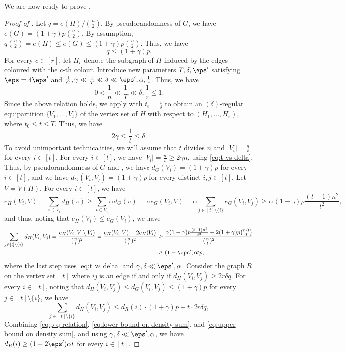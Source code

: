 \documentclass[10pt,a4paper,reqno]{amsart}
\begin{document}
We are now ready to prove .
\begin{proof}[Proof of ]
Let $q = e(H)/\binom{n}{2}$. By pseudorandomness of $G$, we have $e(G) = (1 \pm \gamma)p\binom{n}{2}$. By assumption, $q \binom{n}{2} = e(H)\le e(G) \le (1+\gamma) p \binom{n}{2}$. Thus, we have 
\begin{equation} \label{eq:p q relation}
q \le (1+\gamma)p.
\end{equation}
For every $c\in [r]$, let $H_c$ denote the subgraph of $H$ induced by the edges coloured with the $c$-th colour. 
Introduce new parameters $T,\delta,\eps'$ satisfying $\eps = 4\eps'$ and $\frac{1}{C}, \gamma \ll \frac{1}{T} \ll \delta \ll \eps', \alpha, \frac{1}{r}$. Thus, we have
\[
0< \frac{1}{n} \ll \frac{1}{T} \ll \delta, \frac{1}{r} \le 1.
\]
Since the above relation holds, we apply  with $t_0 = \frac{1}{\delta}$ to obtain an $(\delta)$-regular equipartition $\{V_1,\ldots,V_t\}$ of the vertex set of $H$ with respect to $(H_1,\dots,H_r)$, where $t_0 \le t \le T$. Thus, we have
\begin{equation} \label{eq:t vs delta}
2\gamma \le \frac{1}{t} \le \delta.
\end{equation}
To avoid unimportant technicalities, we will assume that $t$ divides $n$ and $|V_i| = \frac{n}{t}$ for every $i\in [t]$.
For every $i\in [t]$, we have $|V_i| = \frac{n}{t} \ge 2\gamma n$, using \eqref{eq:t vs delta}. Thus, by pseudorandomness of $G$ and , we have $d_G(V_i) = (1\pm \gamma)p$ for every $i\in [t]$, and we have $d_G(V_i,V_j) = (1\pm \gamma)p$ for every distinct $i, j\in [t]$. Let $V=V(H)$.
For every $i\in [t]$, we have 
\[
e_H(V_i,V)=\sum_{v\in V_i} d_H(v)
\ge \sum_{v\in V_i} \alpha d_G(v)
= \alpha e_G(V_i,V)
= \alpha \sum_{j\in [t]\setminus \{i\}} e_G(V_i,V_j)
\ge \alpha (1-\gamma)p \frac{(t-1)n^2}{t^2},
\]
and thus, noting that $e_H(V_i)\le e_G(V_i)$, we have
\begin{align}\label{eq:lower bound on density sum}
\sum_{j\in [t]\setminus \{i\}} d_H(V_i, V_j) 
= \frac{e_H(V_i,V\setminus V_i)}{(\frac{n}{t})^2} 
= \frac{e_H(V_i,V) - 2e_H(V_i)}{(\frac{n}{t})^2} 
&\ge \frac{\alpha (1-\gamma)p\frac{(t-1)n^2}{t^2} - 2(1+\gamma)p\binom{n/t}{2}}{(\frac{n}{t})^2} \nonumber
\\&\ge (1 - \eps')\alpha tp,
\end{align}
where the last step uses \eqref{eq:t vs delta} and $\gamma, \delta \ll \eps', \alpha$.
Consider the graph $R$ on the vertex set $[t]$ where $ij$ is an edge if and only if $d_H(V_i,V_j) \ge 2 r \delta q$. 
For every $i\in [t]$, noting that $d_H(V_i,V_j) \le d_G(V_i,V_j) \le (1+\gamma)p$ for every $j\in [t]\setminus \{i\}$, we have 
\begin{equation}\label{eq:upper bound on density sum}
\sum_{j\in [t]\setminus \{i\}} d_H(V_i, V_j) \le d_R(i) \cdot (1+\gamma)p + t \cdot 2 r \delta q,
\end{equation}
Combining \eqref{eq:p q relation}, \eqref{eq:lower bound on density sum}, and \eqref{eq:upper bound on density sum}, and using $\gamma, \delta \ll \eps', \alpha$, we have $d_R(i)\ge (1 - 2\eps')\alpha t$ for every $i\in [t]$.   


\end{proof}
\end{document}
